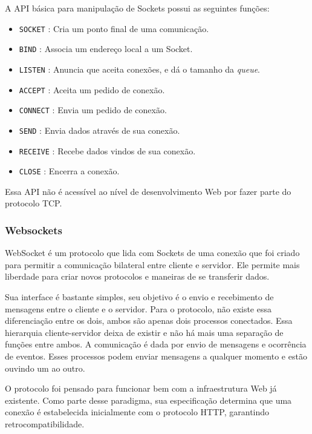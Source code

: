 \documentclass[a4paper,12pt]{article}
\newcommand{\code}[1]{\lstinline[mathescape=true, columns=fixed, basicstyle={\small\ttfamily}]{#1}}
\begin{document}
A API básica para manipulação de Sockets possui as seguintes funções:

\begin{itemize}

    \item \code{SOCKET} : Cria um ponto final de uma comunicação.
    \item \code{BIND} : Associa um endereço local a um Socket.
    \item \code{LISTEN} : Anuncia que aceita conexões, e dá o tamanho da \emph{queue}.
    \item \code{ACCEPT} : Aceita um pedido de conexão.
    \item \code{CONNECT} : Envia um pedido de conexão.
    \item \code{SEND} : Envia dados através de sua conexão.
    \item \code{RECEIVE} : Recebe dados vindos de sua conexão.
    \item \code{CLOSE} : Encerra a conexão.

\end{itemize}

Essa API não é acessível ao nível de desenvolvimento Web por fazer parte do protocolo TCP.


\subsubsection{Websockets}


WebSocket é um protocolo que lida com Sockets de uma conexão que foi criado para permitir a comunicação bilateral entre cliente e servidor. Ele permite mais liberdade para criar novos protocolos e maneiras de se transferir dados.

Sua interface é bastante simples, seu objetivo é o envio e recebimento de mensagens entre o cliente e o servidor. Para o protocolo, não existe essa diferenciação entre os dois, ambos são apenas dois processos conectados. Essa hierarquia cliente-servidor deixa de existir e não há mais uma separação de funções entre ambos. A comunicação é dada por envio de mensagens e ocorrência de eventos. Esses processos podem enviar mensagens a qualquer momento e estão ouvindo um ao outro.

O protocolo foi pensado para funcionar bem com a infraestrutura Web já existente. Como parte desse paradigma, sua especificação determina que uma conexão é estabelecida inicialmente com o protocolo HTTP, garantindo retrocompatibilidade.
\end{document}
